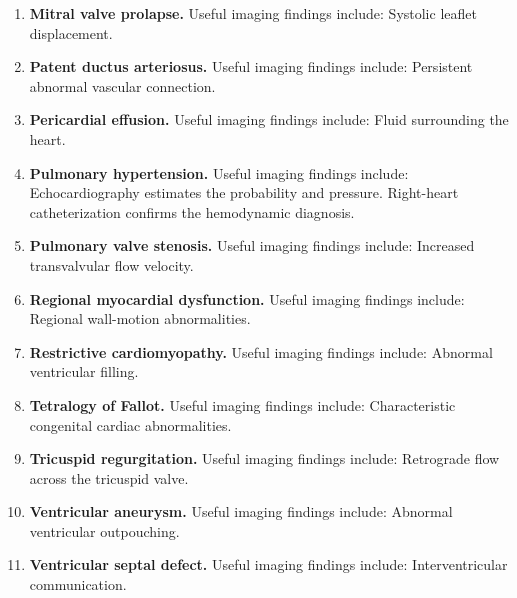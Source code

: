 \begin{enumerate}[leftmargin=*,itemsep=0.45em,topsep=0.4em]
\item \textbf{Mitral valve prolapse.} Useful imaging findings include: Systolic leaflet displacement.
\item \textbf{Patent ductus arteriosus.} Useful imaging findings include: Persistent abnormal vascular connection.
\item \textbf{Pericardial effusion.} Useful imaging findings include: Fluid surrounding the heart.
\item \textbf{Pulmonary hypertension.} Useful imaging findings include: Echocardiography estimates the probability and pressure. Right-heart catheterization confirms the hemodynamic diagnosis.
\item \textbf{Pulmonary valve stenosis.} Useful imaging findings include: Increased transvalvular flow velocity.
\item \textbf{Regional myocardial dysfunction.} Useful imaging findings include: Regional wall-motion abnormalities.
\item \textbf{Restrictive cardiomyopathy.} Useful imaging findings include: Abnormal ventricular filling.
\item \textbf{Tetralogy of Fallot.} Useful imaging findings include: Characteristic congenital cardiac abnormalities.
\item \textbf{Tricuspid regurgitation.} Useful imaging findings include: Retrograde flow across the tricuspid valve.
\item \textbf{Ventricular aneurysm.} Useful imaging findings include: Abnormal ventricular outpouching.
\item \textbf{Ventricular septal defect.} Useful imaging findings include: Interventricular communication.
\end{enumerate}

